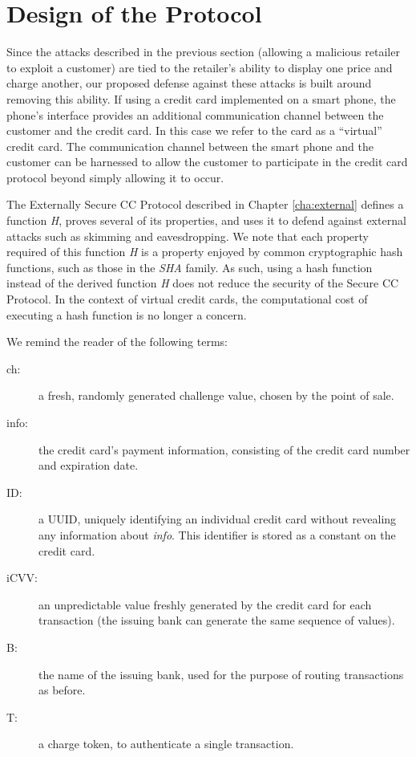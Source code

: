 \section{Design of the Protocol}
\label{sec:secure-design}

Since the attacks described in the previous section (allowing a malicious retailer to exploit a customer)
	are tied to the retailer's ability to display one price and charge another,
	our proposed defense against these attacks is built around removing this ability.
If using a credit card implemented on a smart phone, the phone's interface provides an additional communication channel between the customer and the credit card.
In this case we refer to the card as a ``virtual'' credit card.
The communication channel between the smart phone and the customer can be harnessed to allow the customer to participate in the credit card protocol
	beyond simply allowing it to occur.

The Externally Secure CC Protocol described in Chapter \ref{cha:external} defines a function \emph{H},
    proves several of its properties, and uses it to defend against external attacks such as skimming and eavesdropping.
We note that each property required of this function \emph{H} is a property enjoyed by common cryptographic hash functions,
    such as those in the \emph{SHA} family.
As such, using a hash function instead of the derived function \emph{H} does not reduce the security of the Secure CC Protocol.
In the context of virtual credit cards, the computational cost of executing a hash function is no longer a concern.

We remind the reader of the following terms:

\begin{description}
\item[ch:] a fresh, randomly generated challenge value, chosen by the point of sale.
\item[info:] the credit card's payment information, consisting of the credit card number and expiration date.
\item[ID:] a UUID, uniquely identifying an individual credit card without revealing any information about \emph{info}.
	This identifier is stored as a constant on the credit card.
\item[iCVV:] an unpredictable value freshly generated by the credit card for each transaction (the issuing bank can generate the same sequence of values).
\item[B:] the name of the issuing bank, used for the purpose of routing transactions as before.
\item[T:] a charge token, to authenticate a single transaction.
\end{description}


